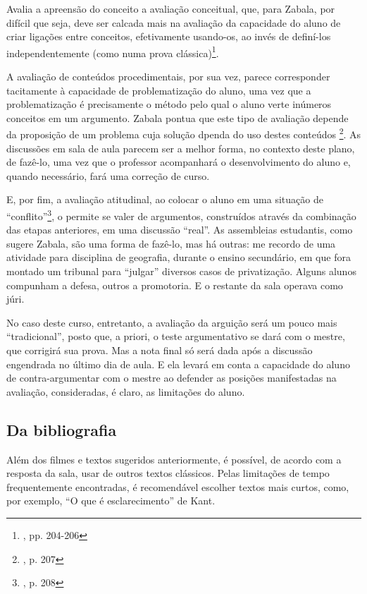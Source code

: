 \documentclass[12pt,a4paper]{article}
\begin{document}
	Avalia a apreensão do conceito a avaliação conceitual, que, para 
	Zabala, por difícil que seja, deve ser calcada mais na avaliação 
	da capacidade do aluno de criar ligações entre conceitos, efetivamente 
	usando-os, ao invés de definí-los independentemente (como numa prova 
	clássica)\footnote{\cite{zabala}, pp. 204-206}. 

	A avaliação de conteúdos procedimentais, por sua vez, parece 
	corresponder tacitamente à capacidade de problematização do aluno, 
	uma vez que a problematização é precisamente o método pelo qual o 
	aluno verte inúmeros conceitos em um argumento. Zabala pontua que 
	este tipo de avaliação depende da proposição de um problema cuja 
	solução dpenda do uso destes conteúdos
	\footnote{\cite{zabala}, p. 207}. As discussões em sala de aula 
	parecem ser a melhor forma, no contexto deste plano, de fazê-lo, uma 
	vez que o professor acompanhará o desenvolvimento do aluno e, quando 
	necessário, fará uma correção de curso. 

	E, por fim, a avaliação atitudinal, ao colocar o aluno em uma situação 
	de “conflito”\footnote{\cite{zabala}, p. 208}, o permite se valer de 
	argumentos, construídos através da combinação das etapas anteriores, 
	em uma discussão “real”. As assembleias estudantis, como sugere 
	Zabala, são uma forma de fazê-lo, mas há outras: me recordo de uma 
	atividade para disciplina de geografia, durante o ensino secundário, 
	em que fora montado um tribunal para “julgar” diversos casos de 
	privatização. Alguns alunos compunham a defesa, outros a promotoria. 
	E o restante da sala operava como júri. 

	No caso deste curso, entretanto, a avaliação da arguição será um 
	pouco mais “tradicional”, posto que, a priori, o teste argumentativo 
	se dará com o mestre, que corrigirá sua prova. Mas a nota final só 
	será dada após a discussão engendrada no último dia de aula. E ela 
	levará em conta a capacidade do aluno de contra-argumentar com o 
	mestre ao defender as posições manifestadas na avaliação, consideradas, 
	é claro, as limitações do aluno. 

	\subsection{Da bibliografia}
	
	Além dos filmes e textos sugeridos anteriormente, é possível, de 
	acordo com a resposta da sala, usar de outros textos clássicos. 
	Pelas limitações de tempo frequentemente encontradas, é recomendável 
	escolher textos mais curtos, como, por exemplo, “O que é 
	esclarecimento” de Kant. 
\end{document}
